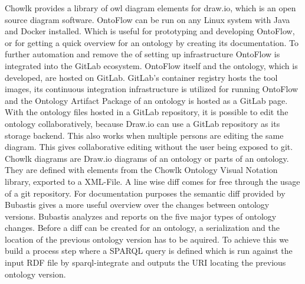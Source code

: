 \documentclass[sigconf]{acmart}
\begin{document}
Chowlk provides a library of owl diagram elements for draw.io, which is an open source diagram software.
OntoFlow can be run on any Linux system with Java and Docker installed.
Which is useful for prototyping and developing OntoFlow, or for getting a quick overview for an ontology by creating its documentation.
To further automation and remove the of setting up infrastructure OntoFlow is integrated into the GitLab ecosystem.
OntoFlow itself and the ontology, which is developed, are hosted on GitLab.
GitLab's container registry hosts the tool images, its continuous integration infrastructure is utilized for running OntoFlow and the Ontology Artifact Package of an ontology is hosted as a GitLab page.
With the ontology files hosted in a GitLab repository, it is possible to edit the ontology collaboratively, because Draw.io can use a GitLab repository as its storage backend.
This also works when multiple persons are editing the same diagram.
This gives collaborative editing without the user being exposed to git.
Chowlk diagrams are Draw.io diagrams of an ontology or parts of an ontology.
They are defined with elements from the Chowlk Ontology Visual Notation library, exported to a XML-File.
A line wise diff comes for free through the usage of a git repository.
For documentation purposes the semantic diff provided by Bubastis gives a more useful overview over the changes between ontology versions.
Bubastis analyzes and reports on the five major types of ontology changes.
Before a diff can be created for an ontology, a serialization and the location of the previous ontology version has to be aquired. To achieve this we build a process step where a SPARQL query is defined which is run against the input RDF file by sparql-integrate and outputs the URI locating the previous ontology version.
\end{document}
